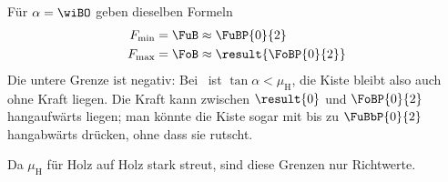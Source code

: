 Für $\alpha = \wiBO$ geben dieselben Formeln
\begin{align}
 F_\mathrm{min} &= \FuB \approx \FuBP{0}{2} \\
 F_\mathrm{max} &= \FoB \approx \result{\FoBP{0}{2}}
\end{align}
Die untere Grenze ist negativ: Bei \wiBO\ ist $\tan\alpha < \mu_\mathrm{H}$, die Kiste bleibt also auch ohne Kraft liegen. Die Kraft kann zwischen $\result{0}$ und $\FoBP{0}{2}$ hangaufwärts liegen; man könnte die Kiste sogar mit bis zu $\FuBbP{0}{2}$ hangabwärts drücken, ohne dass sie rutscht.

Da $\mu_\mathrm{H}$ für Holz auf Holz stark streut, sind diese Grenzen nur Richtwerte.
